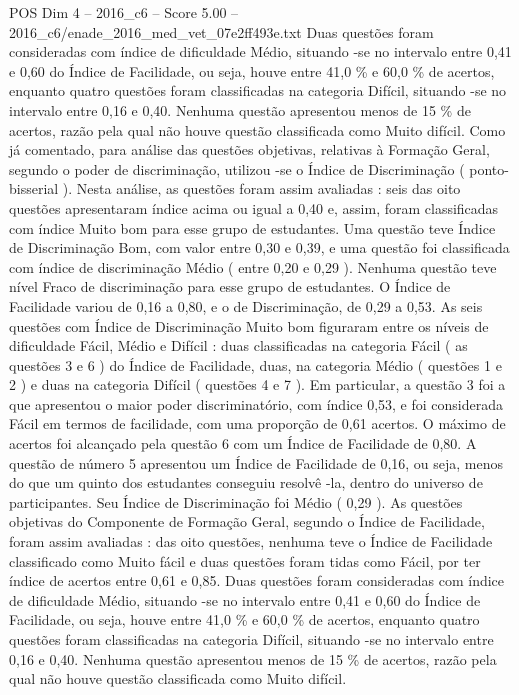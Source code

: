 \begin{textsample}{POS Dim 4 – 2016\_c6 – Score 5.00 – 2016\_c6/enade\_2016\_med\_vet\_07e2ff493e.txt}
Duas questões foram consideradas com índice de dificuldade Médio, situando -se no intervalo entre 0,41 e 0,60 do Índice de Facilidade, ou seja, houve entre 41,0 \% e 60,0 \% de acertos, enquanto quatro questões foram classificadas na categoria Difícil, situando -se no intervalo entre 0,16 e 0,40.
Nenhuma questão apresentou menos de 15 \% de acertos, razão pela qual não houve questão classificada como Muito difícil.
Como já comentado, para análise das questões objetivas, relativas à Formação Geral, segundo o poder de discriminação, utilizou -se o Índice de Discriminação ( ponto-bisserial ).
Nesta análise, as questões foram assim avaliadas : seis das oito questões apresentaram índice acima ou igual a 0,40 e, assim, foram classificadas com índice Muito bom para esse grupo de estudantes.
Uma questão teve Índice de Discriminação Bom, com valor entre 0,30 e 0,39, e uma questão foi classificada com índice de discriminação Médio ( entre 0,20 e 0,29 ).
Nenhuma questão teve nível Fraco de discriminação para esse grupo de estudantes.
O Índice de Facilidade variou de 0,16 a 0,80, e o de Discriminação, de 0,29 a 0,53.
As seis questões com Índice de Discriminação Muito bom figuraram entre os níveis de dificuldade Fácil, Médio e Difícil : duas classificadas na categoria Fácil ( as questões 3 e 6 ) do Índice de Facilidade, duas, na categoria Médio ( questões 1 e 2 ) e duas na categoria Difícil ( questões 4 e 7 ).
Em particular, a questão 3 foi a que apresentou o maior poder discriminatório, com índice 0,53, e foi considerada Fácil em termos de facilidade, com uma proporção de 0,61 acertos.
O máximo de acertos foi alcançado pela questão 6 com um Índice de Facilidade de 0,80.
A questão de número 5 apresentou um Índice de Facilidade de 0,16, ou seja, menos do que um quinto dos estudantes conseguiu resolvê -la, dentro do universo de participantes.
Seu Índice de Discriminação foi Médio ( 0,29 ).
As questões objetivas do Componente de Formação Geral, segundo o Índice de Facilidade, foram assim avaliadas : das oito questões, nenhuma teve o Índice de Facilidade classificado como Muito fácil e duas questões foram tidas como Fácil, por ter índice de acertos entre 0,61 e 0,85.
Duas questões foram consideradas com índice de dificuldade Médio, situando -se no intervalo entre 0,41 e 0,60 do Índice de Facilidade, ou seja, houve entre 41,0 \% e 60,0 \% de acertos, enquanto quatro questões foram classificadas na categoria Difícil, situando -se no intervalo entre 0,16 e 0,40.
Nenhuma questão apresentou menos de 15 \% de acertos, razão pela qual não houve questão classificada como Muito difícil.

\end{textsample}
